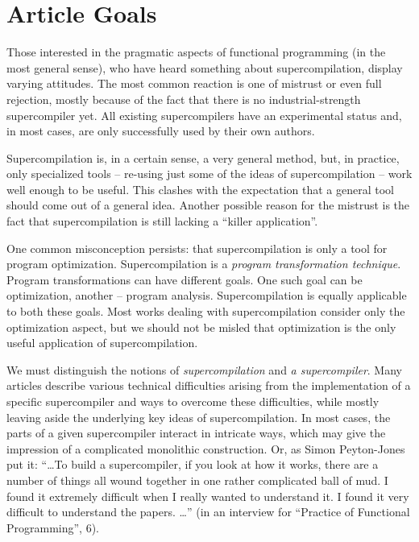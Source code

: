 \section{Article Goals}

%

Those interested in the pragmatic aspects of functional programming (in the most general sense), 
who have heard something about supercompilation, display varying attitudes.
The most common reaction is one of mistrust or even full rejection, 
mostly because of the fact that there is no industrial-strength supercompiler yet. 
All existing supercompilers have an experimental status
and, in most cases, are only successfully used by their own authors.

Supercompilation is, in a certain sense, a very general method, but, in practice, only
specialized tools -- re-using just some of the ideas of supercompilation -- work well
enough to be useful. 
This clashes with the expectation that a general tool should come out of a general idea.
Another possible reason for the mistrust is the fact that supercompilation is still lacking a ``killer application''.

One common misconception persists: that supercompilation is only a tool for program optimization.
Supercompilation is a \emph{program transformation technique}.
Program transformations can have different goals.
One such goal can be optimization, another -- program analysis.
Supercompilation is equally applicable to both these goals.
Most works dealing with supercompilation consider only the optimization aspect,
but we should not be misled that optimization is the only useful application of supercompilation.

We must distinguish the notions of \emph{supercompilation} and \emph{a supercompiler}.
Many articles describe various technical difficulties arising from the implementation
of a specific supercompiler and ways to overcome these difficulties, while mostly
leaving aside the underlying key ideas of supercompilation.
In most cases, the parts of a given supercompiler interact in intricate ways, which
may give the impression of a complicated monolithic 
construction.
Or, as Simon Peyton-Jones put it: 
``\ldots To build a supercompiler, if you look at how it works, there are a number of things all wound together in one rather complicated ball of mud. 
I found it extremely difficult when I really wanted to understand it. 
I found it very difficult to understand the papers. \ldots''
(in an interview for ``Practice of Functional Programming'', 6). 

